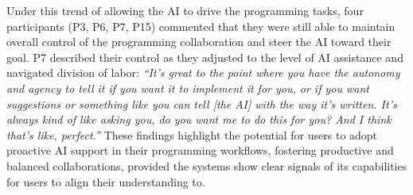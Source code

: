Under this trend of allowing the AI to drive the programming tasks, four participants (P3, P6, P7, P15) commented that they were still able to maintain overall control of the programming collaboration and steer the AI toward their goal.
P7 described their control as they adjusted to the level of AI assistance and navigated division of labor: \textit{``It's great to the point where you have the autonomy and agency to tell it if you want it to implement it for you, or if you want suggestions or something like you can tell [the AI] with the way it's written. It's always kind of like asking you, do you want me to do this for you? And I think that's like, perfect.''}
These findings highlight the potential for users to adopt proactive AI support in their programming workflows, fostering productive and balanced collaborations, provided the systems show clear signals of its capabilities for users to align their understanding to.






